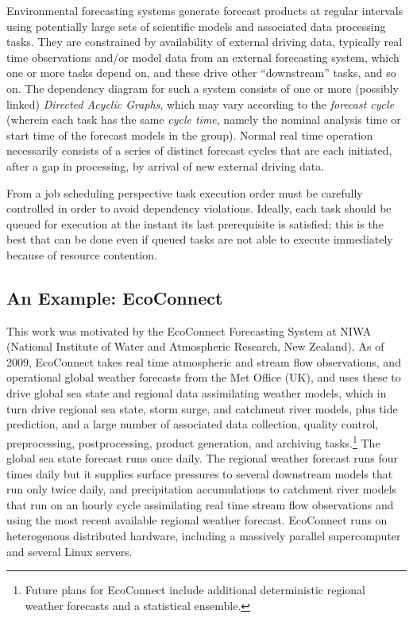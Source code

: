 \documentclass[11pt,a4paper]{article}
\begin{document}
Environmental forecasting systems generate forecast products at regular
intervals using potentially large sets of scientific models and
associated data processing tasks. They are constrained by availability
of external driving data, typically real time observations and/or model
data from an external forecasting system, which one or more tasks depend
on, and these drive other ``downstream'' tasks, and so on. The
dependency diagram for such a system consists of one or more (possibly
linked) {\em Directed Acyclic Graphs}, which may vary according to the
{\em forecast cycle} (wherein each task has the same {\em cycle time},
namely the nominal analysis time or start time of the forecast models in
the group). Normal real time operation necessarily consists of a series
of distinct forecast cycles that are each initiated, after a gap in
processing, by arrival of new external driving data.

From a job scheduling perspective task execution order must be carefully
controlled in order to avoid dependency violations. Ideally, each task
should be queued for execution at the instant its last prerequisite is
satisfied; this is the best that can be done even if queued tasks are
not able to execute immediately because of resource contention.


\subsection{An Example: EcoConnect} 
\label{AnExampleEcoConnect}

This work was motivated by the EcoConnect Forecasting System at NIWA
(National Institute of Water and Atmospheric Research, New Zealand). As
of 2009, EcoConnect takes real time atmospheric and stream flow
observations, and operational global weather forecasts from the Met
Office (UK), and uses these to drive global sea state and regional data
assimilating weather models, which in turn drive regional sea state,
storm surge, and catchment river models, plus tide prediction, and a
large number of associated data collection, quality control,
preprocessing, postprocessing, product generation, and archiving
tasks.\footnote{Future plans for EcoConnect include additional
deterministic regional weather forecasts and a statistical ensemble.}
The global sea state forecast runs once daily.  The regional weather
forecast runs four times daily but it supplies surface pressures to
several downstream models that run only twice daily, and precipitation
accumulations to catchment river models that run on an hourly cycle
assimilating real time stream flow observations and using the most
recent available regional weather forecast.  EcoConnect runs on
heterogenous distributed hardware, including a massively parallel
supercomputer and several Linux servers. 
\end{document}
